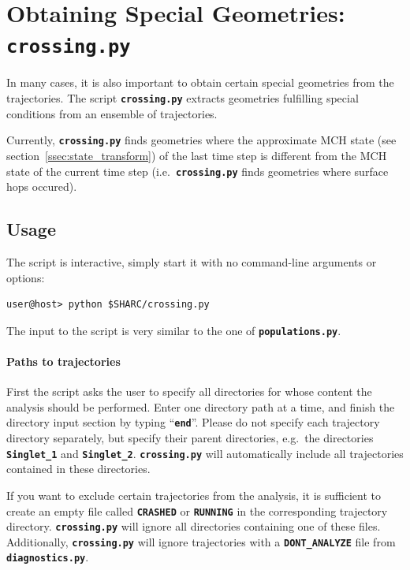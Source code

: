 \documentclass[a4paper,10pt,DIV=15,openany,twoside=false]{scrbook}
\newcommand{\ttt}[1]{\textbf{\texttt{#1}}}
\begin{document}

\section{Obtaining Special Geometries: \ttt{crossing.py}}\label{sec:crossing.py}

In many cases, it is also important to obtain certain special geometries from the trajectories. The script \ttt{crossing.py} extracts geometries fulfilling special conditions from an ensemble of trajectories. 

Currently, \ttt{crossing.py} finds geometries where the approximate MCH state (see section~\ref{ssec:state_transform}) of the last time step is different from the MCH state of the current time step (i.e.\ \ttt{crossing.py} finds geometries where surface hops occured). 

\subsection{Usage}

The script is interactive, simply start it with no command-line arguments or options:
\begin{verbatim}
user@host> python $SHARC/crossing.py
\end{verbatim}

The input to the script is very similar to the one of \ttt{populations.py}. 

\paragraph{Paths to trajectories}

First the script asks the user to specify all directories for whose content the analysis should be performed. Enter one directory path at a time, and finish the directory input section by typing ``\ttt{end}''. Please do not specify each trajectory directory separately, but specify their parent directories, e.g.\ the directories \ttt{Singlet\_1} and \ttt{Singlet\_2}. \ttt{crossing.py} will automatically include all trajectories contained in these directories.

If you want to exclude certain trajectories from the analysis, it is sufficient to create an empty file called \ttt{CRASHED} or \ttt{RUNNING} in the corresponding trajectory directory. \ttt{crossing.py} will ignore all directories containing one of these files.
Additionally, \ttt{crossing.py} will ignore trajectories with a \ttt{DONT\_ANALYZE} file from \ttt{diagnostics.py}.
\end{document}
